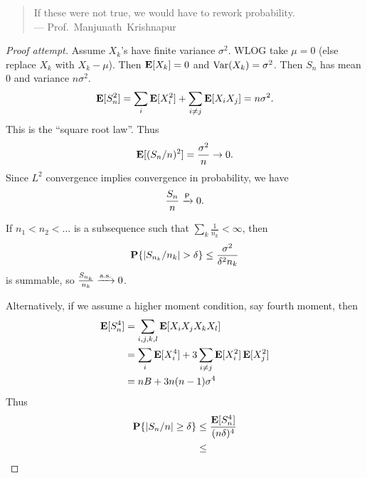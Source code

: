 \begin{quote}
    If these were not true, we would have to rework probability.\\
    \hfill--- Prof.~Manjunath~Krishnapur
\end{quote}

\begin{proof}[Proof attempt]
    Assume $X_k$'s have finite variance $\sigma^2$.
    WLOG take $\mu = 0$ (else replace $X_k$ with $X_k - \mu$).
    Then $\operatorname{\mathbf E}[X_k] = 0$ and $\operatorname{Var}(X_k) = \sigma^2$.
    Then $S_n$ has mean $0$ and variance $n\sigma^2$. \[
        \operatorname{\mathbf E}[S_n^2] = \sum_i \operatorname{\mathbf E}[X_i^2] + \sum_{i \ne j} \operatorname{\mathbf E}[X_i X_j]
            = n \sigma^2.
    \] This is the ``square root law''.
    Thus \[
        \operatorname{\mathbf E}[(S_n/n)^2] = \frac{\sigma^2}{n} \to 0.
    \] Since $L^2$ convergence implies convergence in probability, we have
    \[
        \frac{S_n}{n} \xrightarrow{\mathsf{P}} 0.
    \]

    If $n_1 < n_2 < \dots$ is a subsequence such that
    $\sum_k \frac1{n_k} < \infty$,
    then \[
        \P\set*{\abs*{S_{n_k}/n_k} > \delta}
            \le \frac{\sigma^2}{\delta^2 n_k}
    \] is summable, so $\frac{S_{n_k}}{n_k} \xrightarrow{\text{a.s.}} 0$.

    Alternatively, if we assume a higher moment condition, say fourth
    moment, then \begin{align*}
        \operatorname{\mathbf E}[S_n^4] &= \sum_{i,j,k,l} \operatorname{\mathbf E}[X_i X_j X_k X_l] \\
            &= \sum_i \operatorname{\mathbf E}[X_i^4] + 3 \sum_{i \ne j} \operatorname{\mathbf E}[X_i^2] \operatorname{\mathbf E}[X_j^2] \\
            &= n B + 3n(n-1)\sigma^4
    \end{align*}
    Thus \begin{align*}
        \P\set*{\abs*{S_n/n} \ge \delta}
            &\le \frac{\E[S_n^4]}{(n\delta)^4} \\
            &\le 
    \end{align*}
\end{proof}
